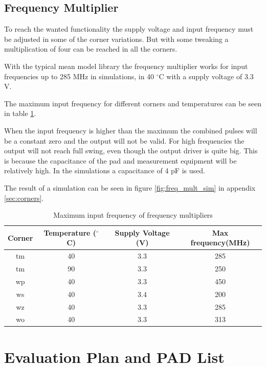 \documentclass[a4paper,12pt]{article} \usepackage{graphicx}
\newcommand{\degree}{\ensuremath{^\circ}}
\begin{document}
\clearpage


\subsection{Frequency Multiplier}
To reach the wanted functionality the supply voltage and input frequency must be
adjusted in some of the corner variations. But with some tweaking a
multiplication of four can be reached in all the corners.

With the typical mean model library the frequency multiplier works for
input frequencies up to 285 MHz in simulations, in 40 \degree C with a supply
voltage of 3.3 V.

The maximum input frequency for different corners and temperatures can be seen
in table \ref{tab:freq_mult}.

When the input frequency is higher than the maximum the combined pulses will be
a constant zero and the output will not be valid. For high frequencies the
output will not reach full swing, even though the output driver is quite big.
This is because the capacitance of the pad and measurement equipment will be
relatively high. In the simulations a capacitance of 4 pF is used.

The result of a simulation can be seen in figure \ref{fig:freq_mult_sim} in appendix
\ref{sec:corners}.
\begin{table}[h]
        \centering
        \begin{tabular}{|c|c|c|c|}
                \hline
        \textbf{Corner} & \textbf{Temperature (\degree C)} &
        \textbf{Supply Voltage (V)} & \textbf{Max frequency(MHz)} \\
        \hline
        tm & 40 & 3.3 & 285 \\
        tm & 90 & 3.3 & 250 \\
        wp & 40 & 3.3 & 450 \\
        ws & 40 & 3.4 & 200 \\
        wz & 40 & 3.3 & 285 \\
        wo & 40 & 3.3 & 313 \\

        \hline
\end{tabular}
\caption{Maximum input frequency of frequency multipliers}
\label{tab:freq_mult}
\end{table}

\newpage
\section{Evaluation Plan and PAD List}
\end{document}
